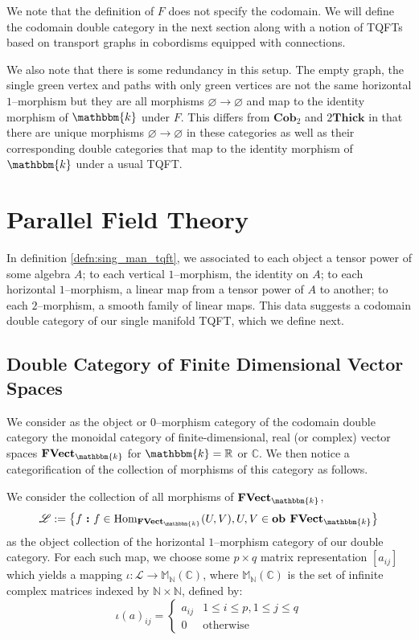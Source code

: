 \documentclass{amsart}
\newcommand{\M}{\mathbb{M}}
\newcommand{\N}{\mathbb{N}}
\newcommand{\R}{\mathbb{R}}
\newcommand{\C}{\mathbb{C}}
\newcommand{\K}{\mathbbm{k}}
\newcommand{\s}{\mathscr}
\renewcommand{\to}[1][]{\stackrel{#1}{\longrightarrow}}
\newcommand{\curly}[1]{\left\{ #1 \right\}}
\newcommand{\set}[2][]{\ifthenelse{\equal{#1}{}}
                                  {\curly{#2}}
                                  {\curly{#1\ \textbf{:}\ #2}}}
\newcommand{\Cob}{\textbf{Cob}}
\newcommand{\FVect}{\textbf{FVect}}
\newcommand{\Thick}{\textbf{Thick}}
\newcommand{\Hom}{\text{Hom}}
\newcommand{\Ob}{\textbf{ob }}
\numberwithin{thm}{section}
\theoremstyle{definition}
\begin{document}
We note that the definition of $F$ does not specify the codomain. We will define
the codomain double category in the next section along with a notion of TQFTs
based on transport graphs in cobordisms equipped with connections.

We also note that there is some redundancy in this setup. The empty graph, the
single green vertex and paths with only green vertices are not the same
horizontal $1$--morphism but they are all morphisms
$\varnothing \to \varnothing$ and map to the identity morphism of $\K$ under
$F$. This differs from $\Cob_2$ and $2\Thick$ in that there are unique
morphisms $\varnothing \to \varnothing$ in these categories as well as their
corresponding double categories that map to the identity morphism of $\K$ under
a usual TQFT.


%

\section{Parallel Field Theory}

In definition \ref{defn:sing_man_tqft}, we associated to each object a tensor
power of some algebra $A$; to each vertical $1$--morphism, the identity on $A$;
to each horizontal $1$--morphism, a linear map from a tensor power of $A$ to
another; to each $2$--morphism, a smooth family of linear maps. This data
suggests a codomain double category of our single manifold TQFT, which we define
next.

%

\subsection{Double Category of Finite Dimensional Vector Spaces}

We consider as the object or $0$--morphism category of the codomain double
category the monoidal category of finite-dimensional, real (or complex) vector
spaces $\FVect_{\K}$ for $\K = \R$ or $\C$. We then notice a categorification
of the collection of morphisms of this category as follows.

We consider the collection of all morphisms of $\FVect_{\K}$,
\[
  \s{L} := \set[f]{f \in \Hom_{\FVect_{\K}}(U, V), U, V \in \Ob \FVect_{\K}}
\]
as the object collection of the horizontal $1$--morphism category of our double
category. For each such map, we choose some $p \times q$ matrix representation
$[a_{ij}]$ which yields a mapping $\iota : \s{L} \to \M_{\N}(\C)$, where
$\M_{\N}(\C)$ is the set of infinite complex matrices indexed by $\N \times \N$,
defined by:
\[
  \iota(a)_{ij} = \begin{cases}
    a_{ij} & 1 \leq i \leq p, 1 \leq j \leq q \\
    0      & \text{otherwise}
  \end{cases}
\]
\end{document}
